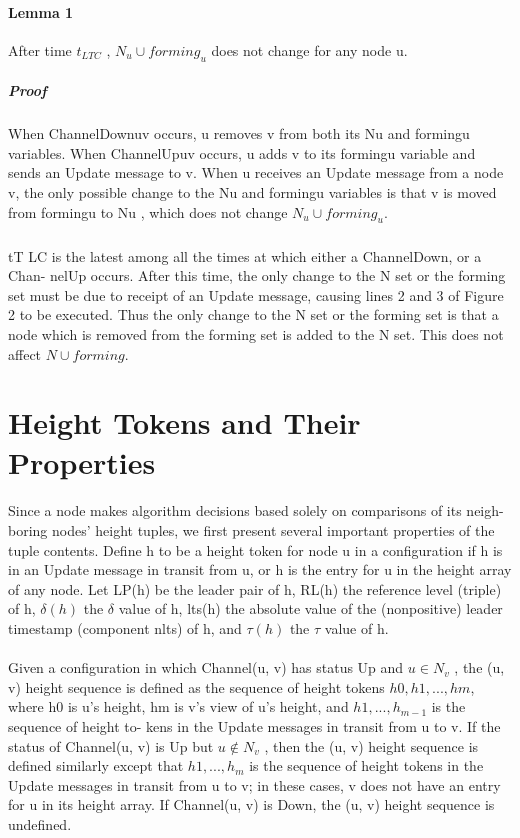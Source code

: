 \paragraph{Lemma 1}After time $t_{LTC}$ , $N_u \cup forming_u$ does not change for any node u.
\subparagraph{Proof}When ChannelDownuv occurs, u removes v from both its Nu and formingu variables. When ChannelUpuv occurs, u adds v to its formingu variable and sends an Update message to v. When u receives an Update message from a node v, the only possible change to the Nu and formingu variables is that v is moved from formingu to Nu , which does not change $N_u \cup forming_u$.
\subparagraph{}tT LC is the latest among all the times at which either a ChannelDown, or a Chan- nelUp occurs. After this time, the only change to the N set or the forming set must be due to receipt of an Update message, causing lines 2 and 3 of Figure 2 to be executed. Thus the only change to the N set or the forming set is that a node which is removed from the forming set is added to the N set. This does not affect $N \cup forming$.
\section{Height Tokens and Their Properties}
\paragraph{}Since a node makes algorithm decisions based solely on comparisons of its neigh- boring nodes’ height tuples, we first present several important properties of the tuple contents. Define h to be a height token for node u in a configuration if h is in an Update message in transit from u, or h is the entry for u in the height array of any node. Let LP(h) be the leader pair of h, RL(h) the reference level (triple) of h, $\delta(h)$ the $\delta$ value of h, lts(h) the absolute value of the (nonpositive) leader timestamp (component nlts) of h, and $\tau (h)$ the $\tau$ value of h.
\paragraph{}Given a configuration in which Channel(u, v) has status Up and $u \in N_v$ , the (u, v) height sequence is defined as the sequence of height tokens $h0, h1, ... , hm$, where h0 is u’s height, hm is v’s view of u’s height, and $h1 , . . . , h_{m-1}$ is the sequence of height to- kens in the Update messages in transit from u to v. If the status of Channel(u, v) is Up but $u \not\in N_v$ , then the (u, v) height sequence is defined similarly except that $h1 , . . . , h_m$ is the sequence of height tokens in the Update messages in transit from u to v; in these cases, v does not have an entry for u in its height array. If Channel(u, v) is Down, the (u, v) height sequence is undefined.
